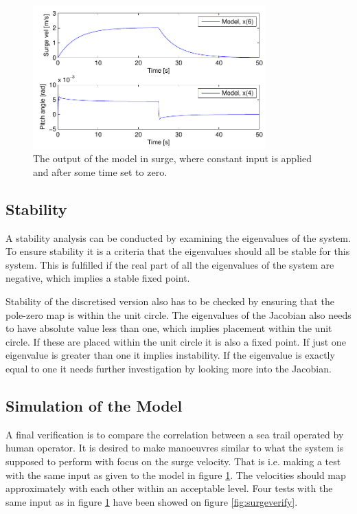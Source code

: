 \begin{figure}
  \centering
  \includegraphics[width=0.8\textwidth]{../../code/matlab/surgemodel}
  \caption{The output of the model in surge, where constant input is applied and after some time set to zero.}
  \label{fig:surgevel}
\end{figure}

\subsection{Stability}
A stability analysis can be conducted by examining the eigenvalues of the system. To ensure stability it is a criteria that the eigenvalues should all be stable for this system. This is fulfilled if the real part of all the eigenvalues of the system are negative, which implies a stable fixed point.

Stability of the discretised version also has to be checked by ensuring that the pole-zero map is within the unit circle. The eigenvalues of the Jacobian also needs to have absolute value less than one, which implies placement within the unit circle. If these are placed within the unit circle it is also a fixed point. If just one eigenvalue is greater than one it implies instability. If the eigenvalue is exactly equal to one it needs further investigation by looking more into the Jacobian.

\subsection{Simulation of the Model}
A final verification is to compare the correlation between a sea trail operated by human operator. It is desired to make manoeuvres similar to what the system is supposed to perform with focus on the surge velocity. That is i.e. making a test with the same input as given to the model in figure \ref{fig:surgevel}. The velocities should map approximately with each other within an acceptable level. Four tests with the same input as in figure \ref{fig:surgevel} have been showed on figure \ref{fig:surgeverify}.


